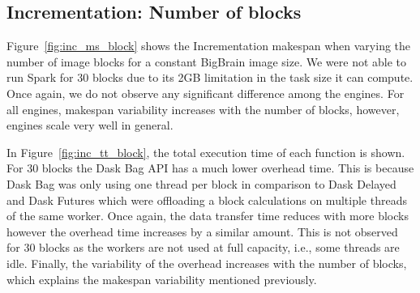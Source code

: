 \documentclass[conference]{IEEEtran}
\begin{document}
\subsection{Incrementation: Number of blocks}

Figure~\ref{fig:inc_ms_block} shows the Incrementation makespan when
varying the number of image blocks for a constant BigBrain image size. We
were not able to run Spark for 30 blocks due to its 2GB limitation in the
task size it can compute. Once again, we do not observe any significant
difference among the engines. For all engines, makespan variability
increases with the number of blocks, however, engines scale very well in
general.


In Figure~\ref{fig:inc_tt_block}, the total execution time of each function is shown.
For 30 blocks the Dask Bag API has a much lower overhead time. This is because Dask Bag was only using one thread per
block in comparison to Dask Delayed and Dask Futures which were offloading a block
calculations on multiple threads of the same worker.  Once again, the data transfer time reduces
with more blocks however the overhead time increases by a similar amount. This is not
observed for 30 blocks as the workers are not used at full capacity, i.e., some
threads are idle. Finally, the variability of the
overhead increases with the number of blocks, which explains the makespan
variability mentioned previously.
\end{document}
